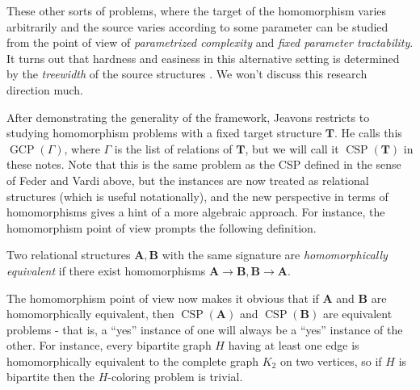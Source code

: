 \documentclass[letterpaper,11pt]{article}
\DeclareMathOperator{\CSP}{CSP}
\begin{document}
These other sorts of problems, where the target of the homomorphism varies arbitrarily and the source varies according to some parameter can be studied from the point of view of \emph{parametrized complexity} and \emph{fixed parameter tractability}. It turns out that hardness and easiness in this alternative setting is determined by the \emph{treewidth} of the source structures \cite{treewidth-homomorphism}. We won't discuss this research direction much.

After demonstrating the generality of the framework, Jeavons \cite{jeavons} restricts to studying homomorphism problems with a fixed target structure $\mathbf{T}$. He calls this $\operatorname{GCP}(\Gamma)$, where $\Gamma$ is the list of relations of $\mathbf{T}$, but we will call it $\CSP(\mathbf{T})$ in these notes. Note that this is the same problem as the CSP defined in the sense of Feder and Vardi above, but the instances are now treated as relational structures (which is useful notationally), and the new perspective in terms of homomorphisms gives a hint of a more algebraic approach. For instance, the homomorphism point of view prompts the following definition.

\begin{defn} Two relational structures $\mathbf{A}, \mathbf{B}$ with the same signature are \emph{homomorphically equivalent} if there exist homomorphisms $\mathbf{A} \rightarrow \mathbf{B}, \mathbf{B} \rightarrow \mathbf{A}$.
\end{defn}

The homomorphism point of view now makes it obvious that if $\mathbf{A}$ and $\mathbf{B}$ are homomorphically equivalent, then $\CSP(\mathbf{A})$ and $\CSP(\mathbf{B})$ are equivalent problems - that is, a ``yes'' instance of one will always be a ``yes'' instance of the other. For instance, every bipartite graph $H$ having at least one edge is homomorphically equivalent to the complete graph $K_2$ on two vertices, so if $H$ is bipartite then the $H$-coloring problem is trivial.
\end{document}
